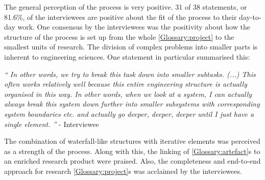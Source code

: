 \documentclass{bausteinefdm}
\begin{document}
The general perception of the process is very positive.
31 of 38 statements, or 81.6\%, of the interviewees are positive about the fit of the process to their day-to-day work.
One consensus by the interviewees was the positivity about how the structure of the process is set up from the whole \ref{Glossary:project} to the smallest units of research.
The division of complex problems into smaller parts is inherent to engineering sciences.
One statement in particular summarised this:

\hfill\begin{minipage}{\dimexpr\textwidth-0.5cm}
    \textit{
        \enquote{
            In other words, we try to break this task down into smaller subtasks. (...) This often works relatively well because this entire engineering structure is actually organised in this way. In other words, when we look at a system, I can actually always break this system down further into smaller subsystems with corresponding system boundaries etc. and actually go deeper, deeper, deeper until I just have a single element.%
        }} - Interviewee
\end{minipage}


The combination of waterfall-like structures with iterative elements was perceived as a strength of the process.
Along with this, the linking of \ref{Glossary:artefact}s to an enriched research product were praised.
Also, the completeness and end-to-end approach for research \ref{Glossary:project}s was acclaimed by the interviewees.
\end{document}
